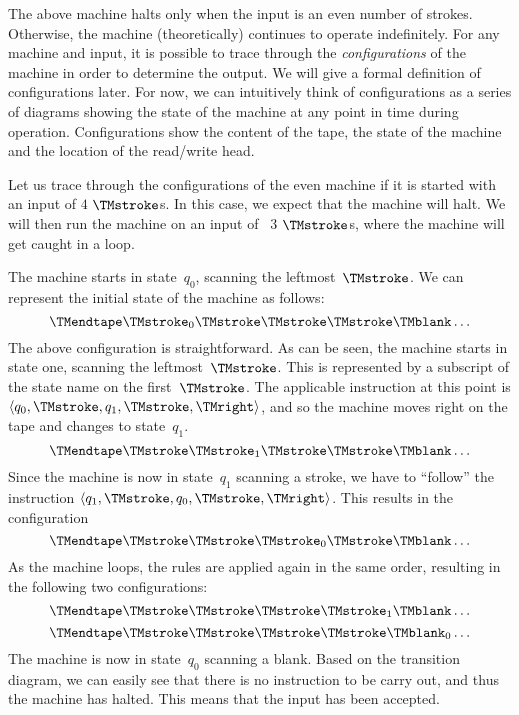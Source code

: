 \documentclass[../../../include/open-logic-section]{subfiles}
\begin{document}
\begin{explain}
The above machine halts only when the input is an even number of strokes.
Otherwise, the machine (theoretically) continues to operate indefinitely. 
For any machine and input, it is possible to trace through the 
\emph{configurations} of the machine in order to determine the output. 
We will give a formal definition of configurations later. For now,
we can intuitively think of configurations as a series of diagrams showing the 
state of the machine at any point in time during operation.
Configurations show the content of the tape, the state of the machine and the
location of the read/write head.

Let us trace through the configurations of the even machine if it is
started with an input of $4$ $\TMstroke$s. In this case, we expect that the
machine will halt.  We will then run the machine on an input of ~$3$
$\TMstroke$s, where the machine will get caught in a loop.

The machine starts in state~$q_0$, scanning the leftmost~$\TMstroke$.
We can represent the initial state of the machine as follows:
\[
\TMendtape \TMstroke_0 \TMstroke \TMstroke \TMstroke \TMblank \ldots
\]
The above configuration is straightforward. As can be seen, the
machine starts in state one, scanning the leftmost~$\TMstroke$. This
is represented by a subscript of the state name on the
first~$\TMstroke$. The applicable instruction at this point is
$\langle q_0, \TMstroke, q_1, \TMstroke, \TMright \rangle$, and so the
machine moves right on the tape and changes to state~$q_1$.
\[
\TMendtape \TMstroke \TMstroke_1 \TMstroke \TMstroke \TMblank \ldots
\]
Since the machine is now in state~$q_1$ scanning a stroke, we have to
``follow'' the instruction $\langle q_1, \TMstroke, q_0, \TMstroke,
\TMright \rangle$. This results in the configuration
\[
\TMendtape \TMstroke \TMstroke \TMstroke_0 \TMstroke \TMblank \ldots
\]
As the machine loops, the rules are applied again in the same order, resulting
in the following two configurations:
\[
\TMendtape \TMstroke \TMstroke \TMstroke \TMstroke_1 \TMblank \ldots
\]
\[
\TMendtape \TMstroke \TMstroke \TMstroke \TMstroke \TMblank_0 \ldots
\]
The machine is now in state~$q_0$ scanning a blank. Based on the
transition diagram, we can easily see that there is no instruction to be
carry out, and thus the machine has halted. This means that the input
has been accepted.


\end{explain}
\end{document}

